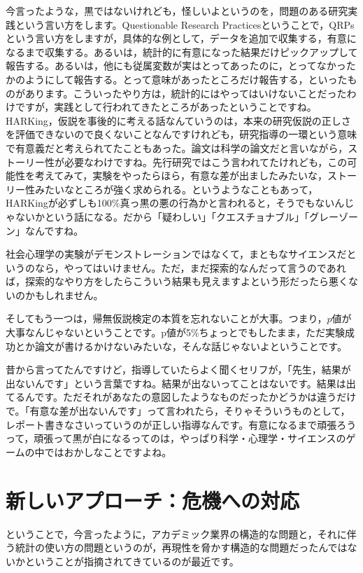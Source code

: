 \documentclass{ltjsbook}
\begin{document}
今言ったような，黒ではないけれども，怪しいよというのを，問題のある研究実践という言い方をします。Questionable Research Practicesということで，QRPsという言い方をしますが，具体的な例として，データを追加で収集する，有意になるまで収集する。あるいは，統計的に有意になった結果だけピックアップして報告する。あるいは，他にも従属変数が実はとってあったのに，とってなかったかのようにして報告する。とって意味があったところだけ報告する，といったものがあります。こういったやり方は，統計的にはやってはいけないことだったわけですが，実践として行われてきたところがあったということですね。HARKing，仮説を事後的に考える話なんていうのは，本来の研究仮説の正しさを評価できないので良くないことなんですけれども，研究指導の一環という意味で有意義だと考えられてたこともあった。論文は科学の論文だと言いながら，ストーリー性が必要なわけですね。先行研究ではこう言われてたけれども，この可能性を考えてみて，実験をやったらほら，有意な差が出ましたみたいな，ストーリー性みたいなところが強く求められる。というようなこともあって，HARKingが必ずしも100\%真っ黒の悪の行為かと言われると，そうでもないんじゃないかという話になる。だから「疑わしい」「クエスチョナブル」「グレーゾーン」なんですね。

社会心理学の実験がデモンストレーションではなくて，まともなサイエンスだというのなら，やってはいけません。ただ，まだ探索的なんだって言うのであれば，探索的なやり方をしたらこういう結果も見えますよという形だったら悪くないのかもしれません。

そしてもう一つは，帰無仮説検定の本質を忘れないことが大事。つまり，$p$値が大事なんじゃないということです。p値が5\%ちょっとでもしたまま，ただ実験成功とか論文が書けるかけないみたいな，そんな話じゃないよということです。

昔から言ってたんですけど，指導していたらよく聞くセリフが，「先生，結果が出ないんです」という言葉ですね。結果が出ないってことはないです。結果は出てるんです。ただそれがあなたの意図したようなものだったかどうかは違うだけで。「有意な差が出ないんです」って言われたら，そりゃそういうものとして，レポート書きなさいっていうのが正しい指導なんです。有意になるまで頑張ろうって，頑張って黒が白になるってのは，やっぱり科学・心理学・サイエンスのゲームの中ではおかしなことですよね。

\section{新しいアプローチ：危機への対応}
ということで，今言ったように，アカデミック業界の構造的な問題と，それに伴う統計の使い方の問題というのが，再現性を脅かす構造的な問題だったんではないかということが指摘されてきているのが最近です。
\end{document}
